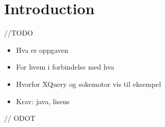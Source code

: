 \chapter{Introduction}
//TODO
\begin{itemize}
\item Hva er oppgaven
\item For hvem i forbindelse med hva
\item Hvorfor XQuery og sokemotor vis til eksempel
\item Krav: java, lisens
\end{itemize}


//  ODOT